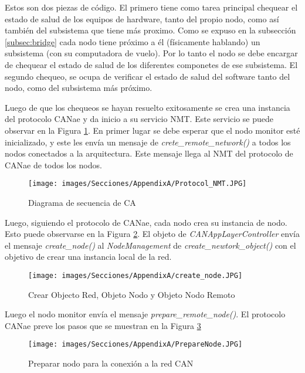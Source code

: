Estos son dos piezas de código. El primero tiene como tarea principal
chequear el estado de salud de los equipos de hardware, tanto
del propio nodo, como así también del subsistema que tiene más proximo.
Como se expuso en la subsección \ref{subsec:bridge} cada nodo tiene
próximo a él (físicamente hablando) un subsistema (con su computadora
de vuelo). Por lo tanto el nodo se debe encargar de chequear el
estado de salud de los diferentes componetes de ese subsistema. El
segundo chequeo, se ocupa de verificar el estado de salud del software
tanto del nodo, como del subsistema más próximo.

Luego de que los chequeos se hayan resuelto exitosamente se crea una
instancia del protocolo CANae y da inicio a su servicio NMT. Este
servicio se puede observar en la Figura \ref{fig:NMTC5}. En primer lugar
se debe esperar que el nodo monitor esté inicializado, y este les
envía un mensaje de \textit{crete\_remote\_network()} a todos los
nodos conectados a la arquitectura. Este mensaje llega al NMT del
protocolo de CANae de todos los nodos.

\begin{figure}[h!]
 \centering
 \texttt{[image: images/Secciones/AppendixA/Protocol\_NMT.JPG]}
  \caption{Diagrama de secuencia de CA}
\label{fig:NMTC5}
\end{figure}

Luego, siguiendo el protocolo de CANae, cada nodo crea su instancia de
nodo. Esto puede observarse en la Figura \ref{fig:CreateNodeNMTC5}.
El objeto de \textit{CANAppLayerController} envía el mensaje \textit{
  create\_node()} al \textit{NodeManagement} de \textit{create\_newtork\_object()} con el objetivo de crear una instancia local de la red.


\begin{figure}[h!]
 \centering
 \texttt{[image: images/Secciones/AppendixA/create\_node.JPG]}
  \caption{Crear Objecto Red, Objeto Nodo y Objeto Nodo Remoto}
  \label{fig:CreateNodeNMTC5}
\end{figure}

Luego el nodo monitor envía el mensaje \textit{prepare\_remote\_node()}.
El protocolo CANae preve los pasos que se muestran en la Figura
\ref{fig:PrepareNodeC5}

\begin{figure}[h!]
 \centering
 \texttt{[image: images/Secciones/AppendixA/PrepareNode.JPG]}
  \caption{Preparar nodo para la conexión a la red CAN}
  \label{fig:PrepareNodeC5}
\end{figure}

